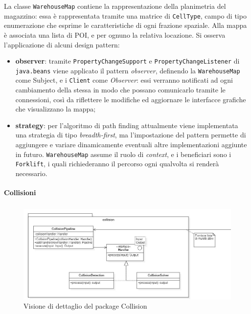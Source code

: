 La classe \texttt{WarehouseMap} contiene la rappresentazione della planimetria del magazzino: essa è rappresentata tramite una matrice di \texttt{CellType}, campo di tipo enumerazione che esprime le caratteristiche di ogni frazione spaziale. Alla mappa è associata una lista di POI, e per ognuno la relativa locazione.
Si osserva l'applicazione di alcuni design pattern:
\begin{itemize}
	\item \textbf{observer}: tramite \texttt{PropertyChangeSupport} e \texttt{PropertyChangeListener} di \texttt{java.beans} viene applicato il pattern \textit{observer}, definendo la \texttt{WarehouseMap} come Subject, e i \texttt{Client} come \textit{Observer}: essi verranno notificati ad ogni cambiamento della stessa in modo che possano comunicarlo tramite le connessioni, così da riflettere le modifiche ed aggiornare le interfacce grafiche che visualizzano la mappa;
	\item \textbf{strategy}: per l’algoritmo di path finding attualmente viene implementata una strategia di tipo \textit{breadth-first}, ma l’impostazione del pattern permette di aggiungere e variare dinamicamente eventuali altre implementazioni aggiunte in futuro. \texttt{WarehouseMap} assume il ruolo di \textit{context}, e i beneficiari sono i \texttt{Forklift}, i quali richiederanno il percorso ogni qualvolta si renderà necessario.
\end{itemize}





\paragraph{Collisioni}
\subparagraph*{ }

\begin{figure}[H]
	\centering
	\includegraphics[scale=0.50]{res/diagrams/server/server_pack_collision.jpg}
	\caption{Visione di dettaglio del package Collision}
\end{figure}


